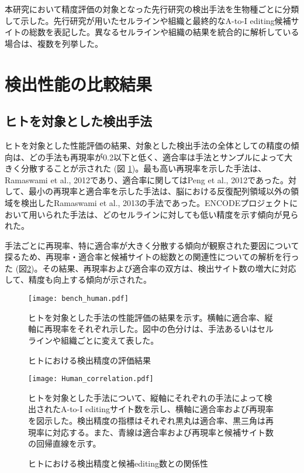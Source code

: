 \begin{flushleft}
	\small{本研究において精度評価の対象となった先行研究の検出手法を生物種ごとに分類して示した。先行研究が用いたセルラインや組織と最終的なA-to-I editing候補サイトの総数を表記した。異なるセルラインや組織の結果を統合的に解析している場合は、複数を列挙した。}
\end{flushleft}
\section{検出性能の比較結果}
\subsection{ヒトを対象とした検出手法}
ヒトを対象とした性能評価の結果、対象とした検出手法の全体としての精度の傾向は、どの手法も再現率が0.2以下と低く、適合率は手法とサンプルによって大きく分散することが示された (図 \ref{fig:human_cr})。最も高い再現率を示した手法は、Ramaswami et al., 2012であり、適合率に関してはPeng et al., 2012であった。対して、最小の再現率と適合率を示した手法は、脳における反復配列領域以外の領域を検出したRamaswami et al., 2013の手法であった。ENCODEプロジェクトにおいて用いられた手法は、どのセルラインに対しても低い精度を示す傾向が見られた。
\par
手法ごとに再現率、特に適合率が大きく分散する傾向が観察された要因について探るため、再現率・適合率と候補サイトの総数との関連性についての解析を行った (図\ref{fig:human_data})。その結果、再現率および適合率の双方は、検出サイト数の増大に対応して、精度も向上する傾向が示された。
\begin{figure}[htbp]
	\begin{center}
		\texttt{[image: bench\_human.pdf]}
	\end{center}
	\caption{ヒトにおける検出精度の評価結果}
	\vspace*{-0.2cm}
	\begin{flushleft}
		\small{ヒトを対象とした手法の性能評価の結果を示す。横軸に適合率、縦軸に再現率をそれぞれ示した。図中の色分けは、手法あるいはセルラインや組織ごとに変えて表した。}
	\end{flushleft}
	\label{fig:human_cr}
\end{figure}
\begin{figure}[htbp]
	\begin{center}
		\texttt{[image: Human\_correlation.pdf]}
	\end{center}
	\caption{ヒトにおける検出精度と候補editing数との関係性}
	\vspace*{-0.2cm}
	\begin{flushleft}
		\small{ヒトを対象とした手法について、縦軸にそれぞれの手法によって検出されたA-to-I editingサイト数を示し、横軸に適合率および再現率を図示した。検出精度の指標はそれぞれ黒丸は適合率、黒三角は再現率に対応する。また、青線は適合率および再現率と候補サイト数の回帰直線を示す。}
	\end{flushleft}
	\label{fig:human_data}
\end{figure}
\newpage
